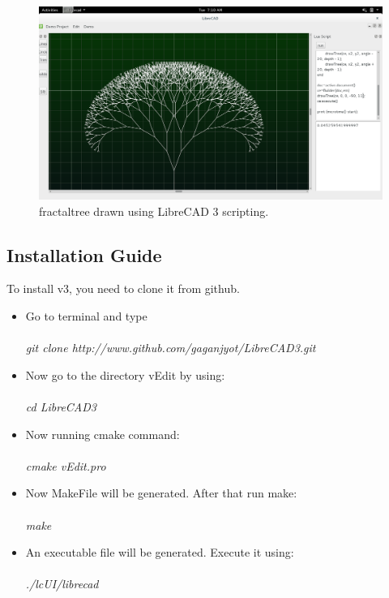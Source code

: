 \begin{figure}[h]
\begin{center}
\includegraphics[scale=0.3]{images/cad/fractaltree.png}
\caption{ fractaltree drawn using LibreCAD 3 scripting. }
\end{center}
\end{figure}

\subsection{Installation Guide}
To install v3, you need to clone it from github.
\begin{itemize}
\item Go to terminal and type\\\\
\textit{git clone http://www.github.com/gaganjyot/LibreCAD3.git}
\item Now go to the directory vEdit by using: \\\\
\textit{cd LibreCAD3}
\item Now running cmake command: \\\\
\textit{cmake vEdit.pro}
\item Now MakeFile will be generated. After that run make: \\\\
\textit{make}
\item An executable file will be generated. Execute it using: \\\\
\textit{./lcUI/librecad}
\end{itemize}
